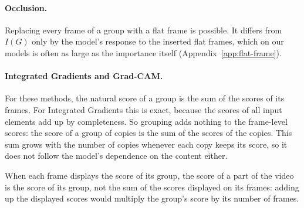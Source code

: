 \paragraph{Occlusion.}
Replacing every frame of a group with a flat frame is possible.
It differs from $I(G)$ only by the model's response to the inserted flat frames, which on our models is often as large as the importance itself (Appendix~\ref{app:flat-frame}).

\paragraph{Integrated Gradients and Grad-CAM.}
For these methods, the natural score of a group is the sum of the scores of its frames.
For Integrated Gradients this is exact, because the scores of all input elements add up by completeness.
So grouping adds nothing to the frame-level scores: the score of a group of copies is the sum of the scores of the copies.
This sum grows with the number of copies whenever each copy keeps its score, so it does not follow the model's dependence on the content either.

When each frame displays the score of its group, the score of a part of the video is the score of its group, not the sum of the scores displayed on its frames: adding up the displayed scores would multiply the group's score by its number of frames.

